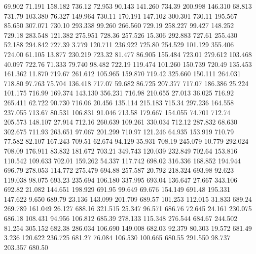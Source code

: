   69.902   71.191  158.182       736.12
  72.953   90.143  141.260       734.39
 200.998  146.310   68.813       731.79
 103.380   76.327  149.964       730.11
 170.191  147.102  300.301       730.11
 195.567   85.650  307.071       730.10
 293.338   99.260  266.560       729.19
 258.227   99.427  148.252       729.18
 283.548  121.382  275.951       728.36
 257.526   15.306  292.883       727.61
 255.430   52.188  294.842       727.39
   3.779  120.711  236.922       725.80
 254.529  101.129  355.406       724.00
  61.105   13.877  230.219       723.32
  81.477   86.905  155.484       723.01
 279.612  103.468   40.097       722.76
  71.333   79.740   98.482       722.19
 119.474  101.260  150.739       720.49
 135.453  161.362   11.870       719.67
 261.612  105.965  159.870       719.42
 325.660  150.111  264.031       718.80
  97.763   75.704  136.418       717.07
  59.682   86.725  207.377       717.07
 186.386   25.224  101.175       716.99
 169.374  143.130  356.231       716.98
 210.655   27.013   36.025       716.92
 265.411   62.722   90.730       716.06
  20.456  135.114  215.183       715.34
 297.236  164.558  237.055       713.67
  80.531  106.831   91.046       713.58
 179.667  154.055   74.701       712.74
 205.573  148.107   27.914       712.16
 260.639  109.261  330.034       712.12
 287.832   68.630  302.675       711.93
 263.651   97.067  201.299       710.97
 121.246   64.935  153.919       710.79
  77.582   82.107  167.243       709.51
  62.674   94.129   35.931       708.19
 245.079   10.779  292.024       708.09
 176.911   83.832  181.672       703.21
 349.743  120.039  232.849       702.64
 153.816  110.542  109.633       702.01
 159.262   54.337  117.742       698.02
 316.336  168.852  194.944       696.79
 278.053  114.772  275.479       694.88
 257.587   20.792  218.324       693.98
  92.623  119.038   98.075       693.23
 235.694  106.180  337.995       693.04
 136.647   27.667  343.106       692.82
  21.082  144.651  198.929       691.95
  99.649   69.676  154.149       691.48
 195.331  147.622    9.650       689.79
  23.136  143.099  201.709       689.57
 101.253  112.015   31.833       689.24
 269.789  161.049   26.127       688.16
 321.515   25.347   96.571       686.76
  72.645   24.161  230.075       686.18
 108.431   94.956  106.812       685.39
 278.133  115.348  276.544       684.67
 244.502   81.254  305.152       682.38
 286.034  106.690  149.008       682.03
  92.379   80.303   19.572       681.49
   3.236  120.622  236.725       681.27
  76.084  106.530  100.665       680.55
 291.550   98.737  203.357       680.50
